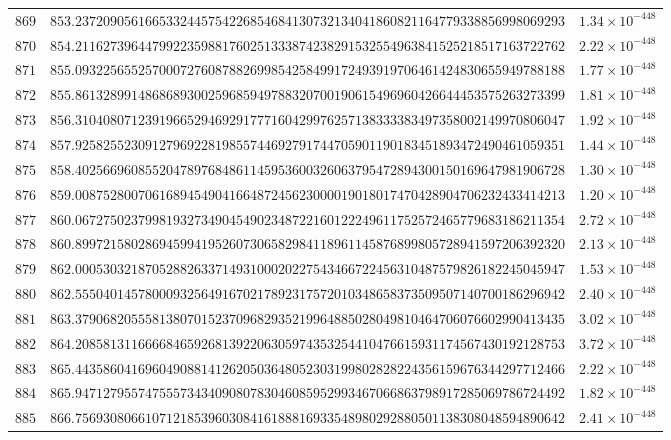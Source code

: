 \documentclass[12pt,reqno]{amsart}
\theoremstyle{remark}
\begin{document}
\begin{longtable}{clc}
$869$ & $853.2372090561665332445754226854684130732134041860821164779338856998069293$ & $1.34\times 10^{-448}$ \\
$870$ & $854.2116273964479922359881760251333874238291532554963841525218517163722762$ & $2.22\times 10^{-448}$ \\
$871$ & $855.0932256552570007276087882699854258499172493919706461424830655949788188$ & $1.77\times 10^{-448}$ \\
$872$ & $855.8613289914868689300259685949788320700190615496960426644453575263273399$ & $1.81\times 10^{-448}$ \\
$873$ & $856.3104080712391966529469291777160429976257138333383497358002149970806047$ & $1.92\times 10^{-448}$ \\
$874$ & $857.9258255230912796922819855744692791744705901190183451893472490461059351$ & $1.44\times 10^{-448}$ \\
$875$ & $858.4025669608552047897684861145953600326063795472894300150169647981906728$ & $1.30\times 10^{-448}$ \\
$876$ & $859.0087528007061689454904166487245623000019018017470428904706232433414213$ & $1.20\times 10^{-448}$ \\
$877$ & $860.0672750237998193273490454902348722160122249611752572465779683186211354$ & $2.72\times 10^{-448}$ \\
$878$ & $860.8997215802869459941952607306582984118961145876899805728941597206392320$ & $2.13\times 10^{-448}$ \\
$879$ & $862.0005303218705288263371493100020227543466722456310487579826182245045947$ & $1.53\times 10^{-448}$ \\
$880$ & $862.5550401457800093256491670217892317572010348658373509507140700186296942$ & $2.40\times 10^{-448}$ \\
$881$ & $863.3790682055581380701523709682935219964885028049810464706076602990413435$ & $3.02\times 10^{-448}$ \\
$882$ & $864.2085813116666846592681392206305974353254410476615931174567430192128753$ & $3.72\times 10^{-448}$ \\
$883$ & $865.4435860416960490881412620503648052303199802828224356159676344297712466$ & $2.22\times 10^{-448}$ \\
$884$ & $865.9471279557475557343409080783046085952993467066863798917285069786724492$ & $1.82\times 10^{-448}$ \\
$885$ & $866.7569308066107121853960308416188816933548980292880501138308048594890642$ & $2.41\times 10^{-448}$ \\

\end{longtable}
\end{document}
